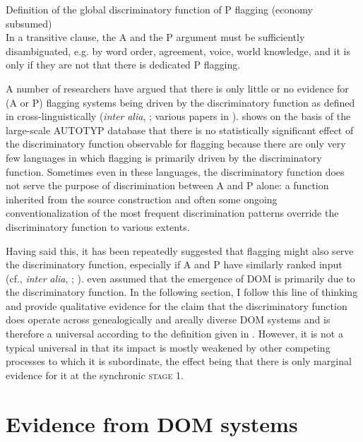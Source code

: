\documentclass[output=paper]{langsci/langscibook}
\begin{document}
\ea\label{ex:serzant:3}
Definition of the global discriminatory function of P flagging (economy subsumed)\\
In a transitive clause, the A and the P argument must be sufficiently disambiguated, e.g. by word order, agreement, voice, world knowledge, and it is only if they are not that there is dedicated P flagging.\\
\z

A number of researchers have argued that there is only little or no evidence for (A or P) flagging systems being driven by the discriminatory function as defined in  cross-linguistically (\textit{inter} \textit{alia}, \citealt{Aissen2003,Malchukov2008}; various papers in \citealt{deHoopdeSwart2009}). \citet{Levshina2018_Effic} shows on the basis of the large-scale AUTOTYP database that there is no statistically significant effect of the discriminatory function observable for flagging because there are only very few languages in which flagging is primarily driven by the discriminatory function. Sometimes even in these languages, the discriminatory function does not serve the purpose of discrimination between A and P alone: a function inherited from the source construction and often some ongoing conventionalization of the most frequent discrimination patterns override the discriminatory function to various extents. 

Having said this, it has been repeatedly suggested that flagging might also serve the discriminatory function, especially if A and P have similarly ranked input (cf., \textit{inter} \textit{alia}, \citealt{Comrie1978,Comrie1989}; \citealt{Dixon1994,Silverstein1976,Kibrik1997}). \citet[117]{Bossong1985} even assumed that the emergence of DOM is primarily due to the discriminatory function. In the following section, I follow this line of thinking and provide qualitative evidence for the claim that the discriminatory function does operate across genealogically and areally diverse DOM systems and is therefore a universal according to the definition given in . However, it is not a typical universal in that its impact is mostly weakened by other competing processes to which it is subordinate, the effect being that there is only marginal evidence for it at the synchronic \textsc{stage} 1.

\section{Evidence from DOM systems}\label{sec:serzant:3}
\end{document}
